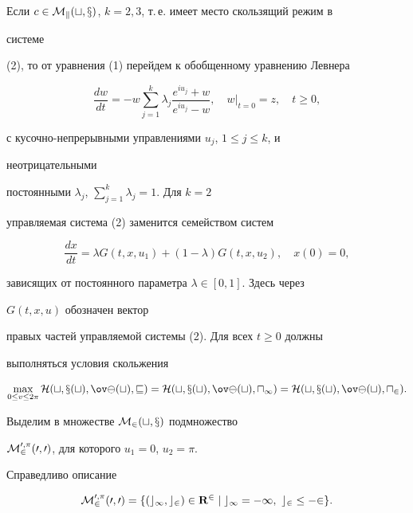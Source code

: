 Если $c\in\cal M_k(t,x)$, $k=2,3$, т.\,е. имеет место скользящий режим в


системе


(2), то от уравнения (1) перейдем к обобщенному уравнению Левнера


\begin{equation}


\frac{dw}{dt}=-w\sum^k_{j=1}\lambda_j


\frac{e^{iu_j}+w}{e^{iu_j}-w},\quad w\big|_{t=0}=z,\quad t\ge 0,


\end{equation}


с кусочно-непрерывными управлениями $u_j$, $1\le j\le k$, и


неотрицательными


постоянными $\lambda_j$, $\sum\limits^k_{j=1}\lambda_j=1$. Для $k=2$


управляемая система (2) заменится семейством систем


\begin{equation}


\frac{dx}{dt}=\lambda G(t,x,u_1)+(1-\lambda)G(t,x,u_2),\quad


x(0)=0,


\end{equation}


зависящих от постоянного параметра $\lambda\in[0,1]$. Здесь через


$G(t,x,u)$ обозначен вектор


правых частей управляемой системы (2). Для всех $t\ge 0$ должны


выполняться условия скольжения


$$


\max_{0\le v\le2\pi}\cal H(t,x(t),\ov\Psi(t),v)=


H(t,x(t),\ov\Psi(t),u_1)=H(t,x(t),\ov\Psi(t),u_2).


$$


Выделим в множестве $\cal M_2(t,x)$ подмножество


$\cal M^{0,\pi}_2(0,0)$, для которого $u_1=0$, $u_2=\pi$.





\begin{lem}


Справедливо описание


$$


\cal M^{0,\pi}_2(0,0)=\{(c_1,c_2)\in\bold R^2\mid


c_1=-1, \ c_2\le -2\}.


$$


\end{lem}





